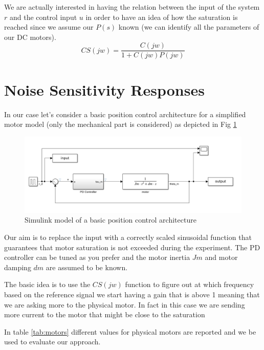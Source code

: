 \documentclass[a4paper,11pt]{article}
\begin{document}
\noindent We are actually interested in having the relation between the input of the system $r$ and the control input $u$ in order to have an idea of how the saturation is reached since we assume our $P(s)$ known (we can identify all the parameters of our DC motors).
\begin{equation}
  CS(jw) = \frac{C(jw)}{1+C(jw)P(jw)}
\end{equation}

\section{Noise Sensitivity Responses}

In our case let's consider a basic position control architecture for a simplified motor model (only the mechanical part is considered) as depicted in Fig \ref{fig:control}

\begin{figure}[H]
\begin{center}
\includegraphics[width=1\textwidth]{images/position.png}
\end{center}
\caption{Simulink model of a basic position control architecture}
\label{fig:control}
\end{figure}

\noindent Our aim is to replace the input with a correctly scaled sinusoidal function that guarantees that motor saturation is not exceeded during the experiment. The PD controller can be tuned as you prefer and the motor inertia $Jm$ and motor damping $dm$ are assumed to be known. 

\bigskip
\noindent The basic idea is to use the $CS(jw)$ function to figure out at which frequency based on the reference signal we start having a gain that is above 1 meaning that we are asking more to the physical motor. In fact in this case we are sending more current to the motor that might be close to the saturation

\bigskip
\noindent In table \ref{tab:motors} different values for physical motors are reported and we be used to evaluate our approach.
\end{document}
